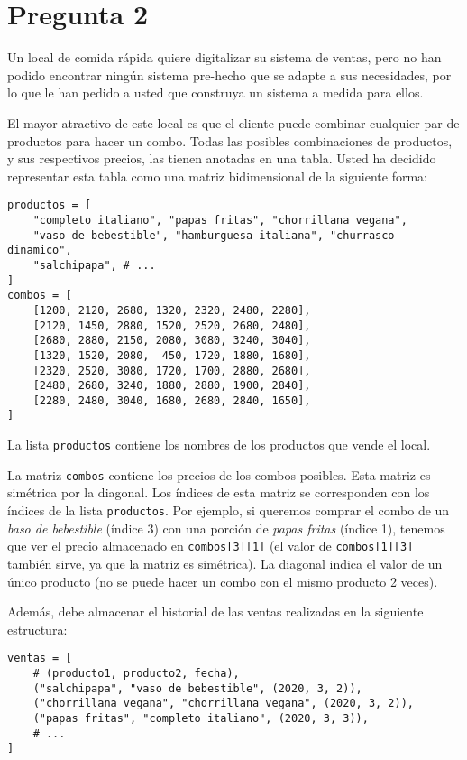 \section{Pregunta 2}

Un local de comida rápida quiere digitalizar su sistema de ventas, pero no han podido encontrar ningún sistema pre-hecho que se adapte a sus necesidades, por lo que le han pedido a usted que construya un sistema a medida para ellos.

El mayor atractivo de este local es que el cliente puede combinar cualquier par de productos para hacer un combo. Todas las posibles combinaciones de productos, y sus respectivos precios, las tienen anotadas en una tabla. Usted ha decidido representar esta tabla como una matriz bidimensional de la siguiente forma:

\begin{lstlisting}[style=consola]
productos = [
    "completo italiano", "papas fritas", "chorrillana vegana", 
    "vaso de bebestible", "hamburguesa italiana", "churrasco dinamico",
    "salchipapa", # ...
]
combos = [
    [1200, 2120, 2680, 1320, 2320, 2480, 2280], 
    [2120, 1450, 2880, 1520, 2520, 2680, 2480], 
    [2680, 2880, 2150, 2080, 3080, 3240, 3040], 
    [1320, 1520, 2080,  450, 1720, 1880, 1680], 
    [2320, 2520, 3080, 1720, 1700, 2880, 2680], 
    [2480, 2680, 3240, 1880, 2880, 1900, 2840], 
    [2280, 2480, 3040, 1680, 2680, 2840, 1650], 
]
\end{lstlisting}

La lista \texttt{productos} contiene los nombres de los productos que vende el local.

La matriz \texttt{combos} contiene los precios de los combos posibles. Esta matriz es simétrica por la diagonal. Los índices de esta matriz se corresponden con los índices de la lista \texttt{productos}. Por ejemplo, si queremos comprar el combo de un \textit{baso de bebestible} (índice 3) con una porción de \textit{papas fritas} (índice 1), tenemos que ver el precio almacenado en \texttt{combos[3][1]} (el valor de \texttt{combos[1][3]} también sirve, ya que la matriz es simétrica). La diagonal indica el valor de un único producto (no se puede hacer un combo con el mismo producto 2 veces).

Además, debe almacenar el historial de las ventas realizadas en la siguiente estructura:

\begin{lstlisting}[style=consola]
ventas = [
    # (producto1, producto2, fecha), 
    ("salchipapa", "vaso de bebestible", (2020, 3, 2)), 
    ("chorrillana vegana", "chorrillana vegana", (2020, 3, 2)), 
    ("papas fritas", "completo italiano", (2020, 3, 3)), 
    # ...
]
\end{lstlisting}

